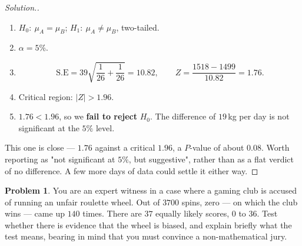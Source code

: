 \documentclass[11pt,a4paper]{article}
\theoremstyle{definition}
\newtheorem{problemx}{Problem}[section]
\newenvironment{problem}{\begin{problemx}}{\end{problemx}}
\newenvironment{solution}
  {\renewcommand{\qedsymbol}{}\begin{proof}[\textit{Solution}.]}
  {\end{proof}}
\begin{document}
\begin{solution}
\begin{enumerate}
\item $H_0:\ \mu_A=\mu_B$; $H_1:\ \mu_A\neq\mu_B$, two-tailed.
\item $\alpha=5\%$.
\item \[\text{S.E}=39\sqrt{\frac{1}{26}+\frac{1}{26}}=10.82,\qquad
Z=\frac{1518-1499}{10.82}=1.76.\]
\item Critical region: $|Z|>1.96$.
\item $1.76<1.96$, so we \textbf{fail to reject} $H_0$. The difference of $19$\,kg per day is
not significant at the $5\%$ level.
\end{enumerate}

This one is close --- $1.76$ against a critical $1.96$, a $P$-value of about $0.08$. Worth
reporting as "not significant at $5\%$, but suggestive", rather than as a flat verdict of no
difference. A few more days of data could settle it either way.
\end{solution}

\begin{problem}
You are an expert witness in a case where a gaming club is accused of running an unfair
roulette wheel. Out of $3700$ spins, zero --- on which the club wins --- came up $140$ times.
There are $37$ equally likely scores, $0$ to $36$. Test whether there is evidence that the
wheel is biased, and explain briefly what the test means, bearing in mind that you must
convince a non-mathematical jury.
\end{problem}
\end{document}
